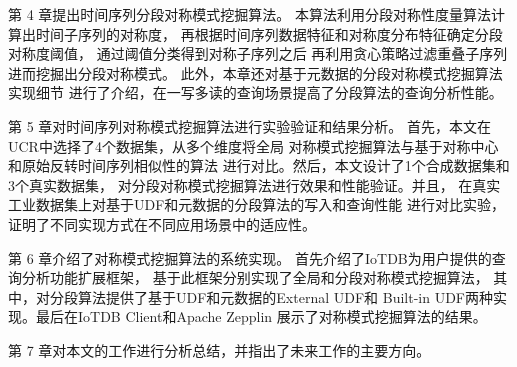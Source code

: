 
第 4 章提出时间序列分段对称模式挖掘算法。
本算法利用分段对称性度量算法计算出时间子序列的对称度，
再根据时间序列数据特征和对称度分布特征确定分段对称度阈值，
通过阈值分类得到对称子序列之后
再利用贪心策略过滤重叠子序列进而挖掘出分段对称模式。
此外，本章还对基于元数据的分段对称模式挖掘算法实现细节
进行了介绍，在一写多读的查询场景提高了分段算法的查询分析性能。

第 5 章对时间序列对称模式挖掘算法进行实验验证和结果分析。
首先，本文在UCR中选择了4个数据集，从多个维度将全局
对称模式挖掘算法与基于对称中心和原始反转时间序列相似性的算法
进行对比。然后，本文设计了1个合成数据集和3个真实数据集，
对分段对称模式挖掘算法进行效果和性能验证。并且，
在真实工业数据集上对基于UDF和元数据的分段算法的写入和查询性能
进行对比实验，证明了不同实现方式在不同应用场景中的适应性。

第 6 章介绍了对称模式挖掘算法的系统实现。
首先介绍了IoTDB为用户提供的查询分析功能扩展框架，
基于此框架分别实现了全局和分段对称模式挖掘算法，
其中，对分段算法提供了基于UDF和元数据的External UDF和
Built-in UDF两种实现。最后在IoTDB Client和Apache Zepplin
\cite{DBLP:conf/xsede/ChengLJXC18}
展示了对称模式挖掘算法的结果。

第 7 章对本文的工作进行分析总结，并指出了未来工作的主要方向。 
